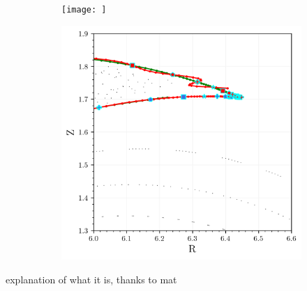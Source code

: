 \begin{figure}[h!]
    \centering
    \begin{subfigure}[c]{0.49\textwidth}
        \centering
        \texttt{[image: ]}
        \caption{}
        \label{fig:}
    \end{subfigure}
    \hfill
    \begin{subfigure}[c]{0.49\textwidth}
        \centering
        \includegraphics[width=\textwidth]{images/high-aspect-ratio/closeup.png}
        \caption{}
        \label{}
    \end{subfigure}
    \caption{}
    \label{}
\end{figure}

explanation of what it is, thanks to mat

